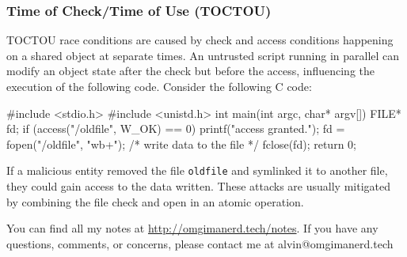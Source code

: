 \documentclass{math}
\begin{document}
\subsubsection*{Time of Check/Time of Use (TOCTOU)}
TOCTOU race conditions are caused by check and access conditions happening on
a shared object at separate times. An untrusted script running in parallel can
modify an object state after the check but before the access, influencing the
execution of the following code. Consider the following C code:
\begin{lstlistings}
#include <stdio.h>
#include <unistd.h>
int main(int argc, char* argv[]) {
  FILE* fd;
  if (access("/oldfile", W_OK) == 0) {
    printf("access granted.\n");
    fd = fopen("/oldfile", "wb+");
    /* write data to the file */
    fclose(fd);
  }
  return 0;
}
\end{lstlistings}
If a malicious entity removed the file \texttt{oldfile} and symlinked it to
another file, they could gain access to the data written. These attacks are
usually mitigated by combining the file check and open in an atomic operation.

\begin{center}
  You can find all my notes at \url{http://omgimanerd.tech/notes}. If you have
  any questions, comments, or concerns, please contact me at
  alvin@omgimanerd.tech
\end{center}
\end{document}
